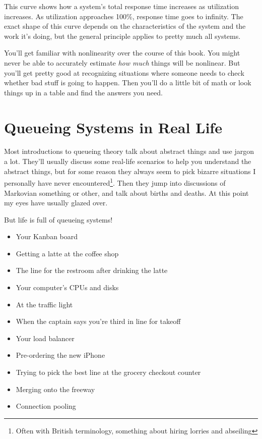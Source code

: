 \documentclass{vivid_layout_pdf}
\begin{document}
This curve shows how a system's total response time increases as utilization increases. As utilization approaches 100\%, response time goes to infinity. The exact shape of this curve depends on the characteristics of the system and the work it's doing, but the general principle applies to pretty much all systems.

You'll get familiar with nonlinearity over the course of this book. You might never be able to accurately estimate {\itshape how much} things will be nonlinear. But you'll get pretty good at recognizing situations where someone needs to check whether bad stuff is going to happen. Then you'll do a little bit of math or look things up in a table and find the answers you need.

\section{Queueing Systems in Real Life}	%

Most introductions to queueing theory talk about abstract things and use jargon a lot. They'll usually discuss some real-life scenarios to help you understand the abstract things, but for some reason they always seem to pick bizarre situations I personally have never encountered\footnote{Often with British terminology, something about hiring lorries and abseiling}. Then they jump into discussions of Markovian something or other, and talk about births and deaths. At this point my eyes have usually glazed over.

But life is full of queueing systems!
\begin{itemize}		%
\item Your Kanban board
\item Getting a latte at the coffee shop
\item The line for the restroom after drinking the latte
\item Your computer's CPUs and disks
\item At the traffic light
\item When the captain says you're third in line for takeoff
\item Your load balancer
\item Pre-ordering the new iPhone
\item Trying to pick the best line at the grocery checkout counter
\item Merging onto the freeway
\item Connection pooling
\end{itemize}
\end{document}
